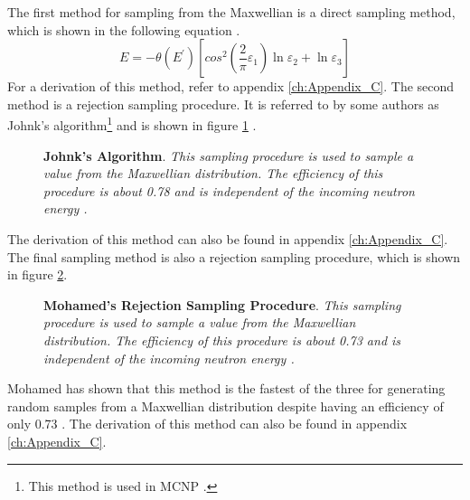 The first method for sampling from the Maxwellian is a direct sampling method, 
which is shown in the following equation \citep{mohamed_efficient_2011}.
\begin{equation}
  E = -\theta(E^{'})\left[cos^2\left(\frac{2}{\pi}\varepsilon_1\right)
    \ln{\varepsilon_2} + \ln{\varepsilon_3}\right]
\end{equation}
For a derivation of this method, refer to appendix \ref{ch:Appendix_C}. The
second method is a rejection sampling procedure. It is referred to by
some authors as Johnk's algorithm\footnote{This method is used in MCNP 
\citep{x-5_monte_carlo_team_mcnp_2003}.} and is shown in figure 
\ref{fig:Johnks_algorithm} \citep{mohamed_efficient_2011, c._j._everett_third_1983}. 
\begin{figure}[t!]
  \begin{center}
    \def\svgwidth{170bp}
    
  \end{center}
  \caption{\textbf{Johnk's Algorithm}.
    \textit{This sampling procedure is used to sample a value from the 
      Maxwellian distribution. The efficiency of this procedure is about
      0.78 and is independent of the incoming neutron energy 
      \citep{mohamed_efficient_2011}.}}
  \label{fig:Johnks_algorithm}
\end{figure}
The derivation of this method can also be found in appendix \ref{ch:Appendix_C}.
The final sampling method is also a rejection sampling procedure, which is shown
in figure \ref{fig:Mohameds_rejection_sampling_procedure}. 
\begin{figure}[t!]
  \begin{center}
    \def\svgwidth{120bp}
    
  \end{center}
  \caption{\textbf{Mohamed's Rejection Sampling Procedure}.
    \textit{This sampling procedure is used to sample a value from the
      Maxwellian distribution. The efficiency of this procedure is about
      0.73 and is independent of the incoming neutron energy
      \citep{mohamed_efficient_2011}.}}
  \label{fig:Mohameds_rejection_sampling_procedure}
\end{figure}
Mohamed has shown that this method is the fastest of the three for generating 
random samples from a Maxwellian distribution despite having an efficiency of 
only 0.73 \citep{mohamed_efficient_2011}. The derivation of this method can 
also be found in appendix \ref{ch:Appendix_C}.

